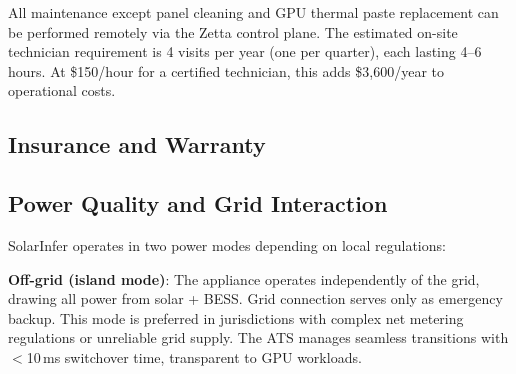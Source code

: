 \documentclass[conference,10pt,letterpaper]{IEEEtran}
\begin{document}
All maintenance except panel cleaning and GPU thermal paste replacement can be performed remotely via the Zetta control plane. The estimated on-site technician requirement is 4 visits per year (one per quarter), each lasting 4--6 hours. At \$150/hour for a certified technician, this adds \$3,600/year to operational costs.

\subsection{Insurance and Warranty}

\begin{table}[!t]
\caption{Warranty and Insurance Coverage}
\label{tab:warranty}
\centering\scriptsize
{}
\end{table}



\subsection{Power Quality and Grid Interaction}

SolarInfer operates in two power modes depending on local regulations:

\textbf{Off-grid (island mode)}: The appliance operates independently of the grid, drawing all power from solar + BESS. Grid connection serves only as emergency backup. This mode is preferred in jurisdictions with complex net metering regulations or unreliable grid supply. The ATS manages seamless transitions with $<$10\,ms switchover time, transparent to GPU workloads.
\end{document}
